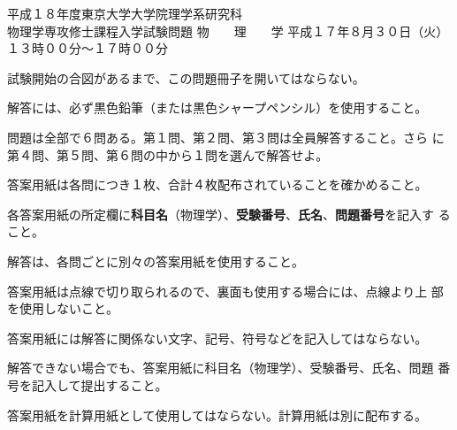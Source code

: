 \begin{inshicover}%
  {平成１８年度東京大学大学院理学系研究科\\物理学専攻修士課程入学試験問題}%
  {物　　理　　学}%
  {平成１７年８月３０日（火）　１３時００分〜１７時００分}
\item 試験開始の合図があるまで、この問題冊子を開いてはならない。
\item 解答には、必ず黒色鉛筆（または黒色シャープペンシル）を使用すること。
\item 問題は全部で６問ある。第１問、第２問、第３問は全員解答すること。さら
      に第４問、第５問、第６問の中から１問を選んで解答せよ。
\item 答案用紙は各問につき１枚、合計４枚配布されていることを確かめること。
\item 各答案用紙の所定欄に{\bf 科目名}（物理学）、{\bf 受験番号}、{\bf 氏名}、{\bf 問題番号}を記入す
      ること。
\item 解答は、各問ごとに別々の答案用紙を使用すること。
\item 答案用紙は点線で切り取られるので、裏面も使用する場合には、点線より上
      部を使用しないこと。
\item 答案用紙には解答に関係ない文字、記号、符号などを記入してはならない。
\item 解答できない場合でも、答案用紙に科目名（物理学）、受験番号、氏名、問題
      番号を記入して提出すること。
\item 答案用紙を計算用紙として使用してはならない。計算用紙は別に配布する。
\end{inshicover}
